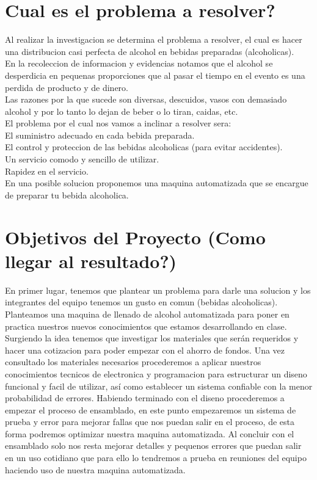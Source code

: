 \documentclass[12pt,a4paper]{report}
\begin{document}
\section{Cual es el problema a resolver?}
Al realizar la investigacion se determina el problema a resolver, el cual es hacer una distribucion casi perfecta de alcohol en bebidas preparadas (alcoholicas).\\
En la recoleccion de informacion y evidencias notamos que el alcohol se desperdicia en pequenas proporciones que al pasar el tiempo en el evento es una perdida de producto y de dinero.\\
Las razones por la que sucede son diversas, descuidos, vasos con demasiado alcohol y por lo tanto lo dejan de beber o lo tiran, caidas, etc.\\
El problema por el cual nos vamos a inclinar a resolver sera:\\
     El suministro adecuado en cada bebida preparada.\\
     El control y proteccion de las bebidas alcoholicas (para evitar accidentes).\\
    Un servicio comodo y sencillo de utilizar.\\
    Rapidez en el servicio.\\
En una posible solucion proponemos una maquina automatizada que se encargue de preparar tu bebida alcoholica.

\section{Objetivos del Proyecto (Como llegar al resultado?)}
En primer lugar, tenemos que plantear un problema para darle una solucion y los integrantes del equipo tenemos un gusto en comun (bebidas alcoholicas). Planteamos una maquina de llenado de alcohol automatizada para poner en practica nuestros nuevos conocimientos que estamos desarrollando en clase.
Surgiendo la idea tenemos que investigar los materiales que serán requeridos y hacer una cotizacion para poder empezar con el ahorro de fondos.
Una vez consultado los materiales necesarios procederemos a aplicar nuestros conocimientos tecnicos de electronica y programacion para estructurar un diseno funcional y facil de utilizar, así como establecer un sistema confiable con la menor probabilidad de errores.
Habiendo terminado con el diseno procederemos a empezar el proceso de ensamblado, en este punto empezaremos un sistema de prueba y error para mejorar fallas que nos puedan salir en el proceso, de esta forma podremos optimizar nuestra maquina automatizada.
Al concluir con el ensamblado solo nos resta mejorar detalles y pequenos errores que puedan salir en un uso cotidiano que para ello lo tendremos a prueba en reuniones del equipo haciendo uso de nuestra maquina automatizada.
\end{document}
